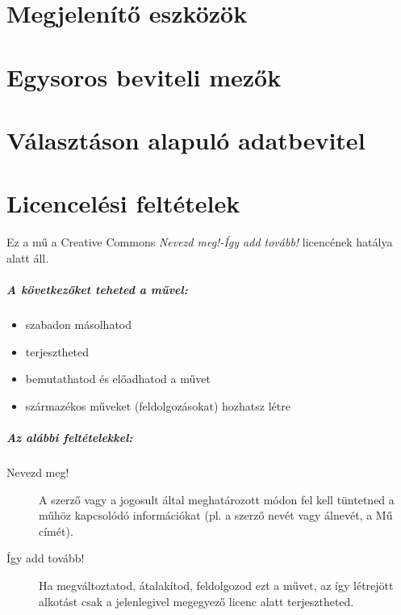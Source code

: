 \documentclass[a4paper, titlepage]{report}
\begin{document}
\chapter{Megjelenítő eszközök}


\chapter{Egysoros beviteli mezők}


\chapter{Választáson alapuló adatbevitel}


\appendix

\chapter{Licencelési feltételek}

Ez a mű a Creative Commons \textit{Nevezd meg!-Így add tovább!} licencének hatálya alatt áll.

\paragraph{A következőket teheted a művel:}

\begin{itemize}
 \item szabadon másolhatod
 \item terjesztheted
 \item bemutathatod és előadhatod a művet 
 \item származékos műveket (feldolgozásokat) hozhatsz létre
\end{itemize}

\paragraph{Az alábbi feltételekkel:}

\begin{description}
 \item[Nevezd meg!] A szerző vagy a jogosult által meghatározott módon fel kell tüntetned a műhöz kapcsolódó információkat (pl. a szerző nevét vagy álnevét, a Mű címét).
 \item[Így add tovább!] Ha megváltoztatod, átalakítod, feldolgozod ezt a művet, az így létrejött alkotást csak a jelenlegivel megegyező licenc alatt terjesztheted.
\end{description}
\end{document}
